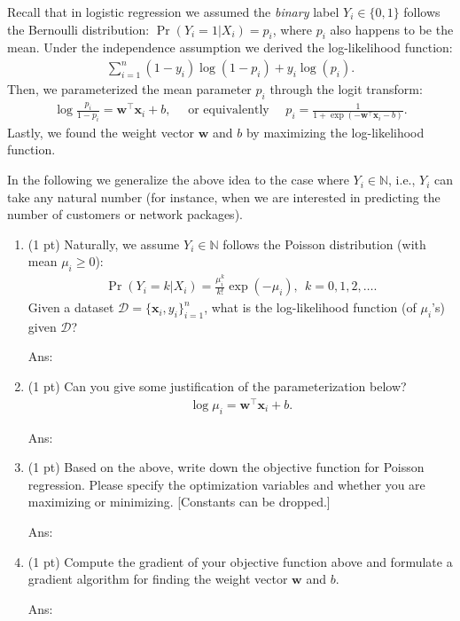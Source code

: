 \documentclass[10pt,letter,notitlepage]{article}
\newcommand{\wv}{\mathbf{w}}
\newcommand{\xv}{\mathbf{x}}
\newcommand{\Dc}{\mathcal{D}}
\newcommand{\ans}[1]{{\color{orange}\textsf{Ans}: #1}}
\newcounter{exercise}
\begin{document}
\begin{exercise}
Recall that in logistic regression we assumed the \emph{binary} label $Y_i \in \{0,1\}$ follows the Bernoulli distribution: $\Pr(Y_i = 1 | X_i) = p_i$, where $p_i$ also happens to be the mean. Under the independence assumption we derived the log-likelihood function:
\begin{align}
\sum_{i=1}^n (1-y_i) \log(1-p_i) + y_i \log(p_i).
\end{align}
Then, we parameterized the mean parameter $p_i$ through the logit transform:
\begin{align}
\log\frac{p_i}{1-p_i} = \wv^\top \xv_i + b, \quad \mbox{ or equivalently } \quad p_i = \frac{1}{1+\exp(-\wv^\top \xv_i - b)}.
\end{align}
Lastly, we found the weight vector $\wv$ and $b$ by maximizing the log-likelihood function.

In the following we generalize the above idea to the case where $Y_i \in \mathds{N}$, i.e., $Y_i$ can take any natural number (for instance, when we are interested in predicting the number of customers or network packages).

\begin{enumerate}
\item (1 pt) Naturally, we assume $Y_i \in \mathds{N}$ follows the Poisson distribution (with mean $\mu_i \geq 0$):
	\begin{align}
	\Pr(Y_i = k | X_i) = \frac{\mu_i^k}{k!} \exp(-\mu_i), ~~ k = 0, 1, 2, \ldots.
	\end{align}
	Given a dataset $\Dc = \{\xv_i, y_i\}_{i=1}^n$, what is the log-likelihood function (of $\mu_i$'s) given $\Dc$?

\ans{}

\item (1 pt) Can you give some justification of the parameterization below?
	\begin{align}
	\log\mu_i = \wv^\top \xv_i + b.
	\end{align}

\ans{}

\item (1 pt) Based on the above, write down the objective function for Poisson regression. Please specify the optimization variables and whether you are maximizing or minimizing. [Constants can be dropped.]

\ans{}

\item (1 pt) Compute the gradient of your objective function above and formulate a gradient algorithm for finding the weight vector $\wv$ and $b$.

\ans{}

\end{enumerate}
\end{exercise}
\end{document}
